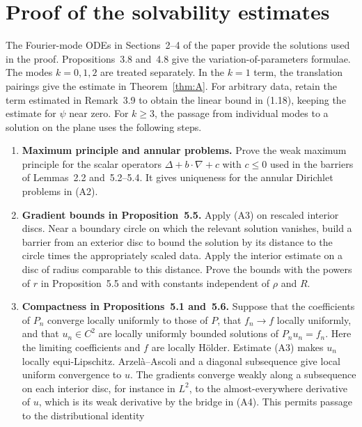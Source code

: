 \documentclass[11pt]{amsart}
\theoremstyle{definition}
\begin{document}
\section{Proof of the solvability estimates}\label{sec:route}

The Fourier-mode ODEs in Sections~2--4 of the paper provide the solutions used
in the proof. Propositions~3.8 and~4.8 give the variation-of-parameters
formulae. The modes $k=0,1,2$ are treated separately. In the $k=1$ term,
the translation pairings give the estimate in Theorem~\ref{thm:A}.
For arbitrary data, retain the term estimated in Remark~3.9 to obtain the
linear bound in (1.18), keeping the estimate for $\psi$ near zero. For
$k\ge3$, the passage from individual modes to a solution on the plane
uses the following steps.

\begin{enumerate}[label=(\alph*)]
  \item \textbf{Maximum principle and annular problems.} Prove the weak
        maximum principle for the scalar operators $\Delta+b\cdot\nabla+c$
        with $c\le0$ used in the barriers of Lemmas~2.2 and~5.2--5.4.
        It gives uniqueness for the annular Dirichlet problems in (A2).
  \item \textbf{Gradient bounds in Proposition~5.5.} Apply (A3) on
        rescaled interior discs. Near a boundary circle on which the relevant
        solution vanishes, build a barrier from an exterior disc to bound the
        solution by its distance to the circle times the appropriately scaled
        data. Apply the interior estimate on a disc of radius comparable to
        this distance. Prove the bounds with the powers of $r$ in
        Proposition~5.5 and with constants independent of $\rho$ and $R$.
  \item \textbf{Compactness in Propositions~5.1 and~5.6.} Suppose that the
        coefficients of $P_n$ converge locally uniformly to those of $P$, that
        $f_n\to f$ locally uniformly, and that $u_n\in C^2$ are locally
        uniformly bounded solutions of $P_nu_n=f_n$. Here the limiting
        coefficients and $f$ are locally H\"older. Estimate (A3) makes $u_n$
        locally equi-Lipschitz. Arzel\`a--Ascoli and a diagonal subsequence give
        local uniform convergence to $u$. The gradients converge weakly along
        a subsequence on each interior disc, for instance in $L^2$, to the
        almost-everywhere derivative of $u$, which is its weak derivative by the
        bridge in (A4). This permits passage to the distributional identity

\end{enumerate}
\end{document}
